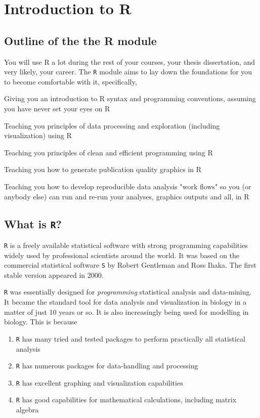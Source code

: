 \chapter{Introduction to {R}}
\label{chap:RI}

\section{Outline of the the R module} 

You will use R a lot during the rest of your courses, your thesis 
dissertation, and very likely, your career. The {\tt R} module aims to lay 
down the foundations for you to become comfortable with it, specifically,

\begin{compactitem}\itemsep4pt
		\item Giving you an introduction to R syntax and programming 
		conventions, assuming you have never set your eyes on R

    \item Teaching you principles of data processing and exploration 
    (including visualization) using R

    \item Teaching you principles of clean and efficient programming using R

		\item Teaching you how to generate publication quality graphics in R 

		\item Teaching you how to develop reproducible data analysis "work 
	flows" so you (or anybody else) can run and re-run your analyses,
	graphics outputs and all, in R 
\end{compactitem} 


\section{What is {\tt R}?} 

{\tt R} is a freely available statistical software with strong 
programming capabilities widely used by professional scientists around 
the world. It was based on the commercial statistical software {\tt S} 
by Robert Gentleman and Ross Ihaka. The first stable version appeared 
in 2000. 

{\tt R} was essentially designed for {\it programming} statistical 
analysis and data-mining. It became the standard tool for data 
analysis and visualization in biology in a matter of just 10 years or 
so. It is also increasingly being used for modelling in biology. This 
is because 
\begin{enumerate}
\item {\tt R} has many tried and tested packages to perform practically all statistical analysis
\item {\tt R} has numerous packages for data-handling and processing   
\item {\tt R} has excellent graphing and visualization capabilities
\item {\tt R} has good capabilities for mathematical calculations, including matrix algebra 
\end{enumerate}


